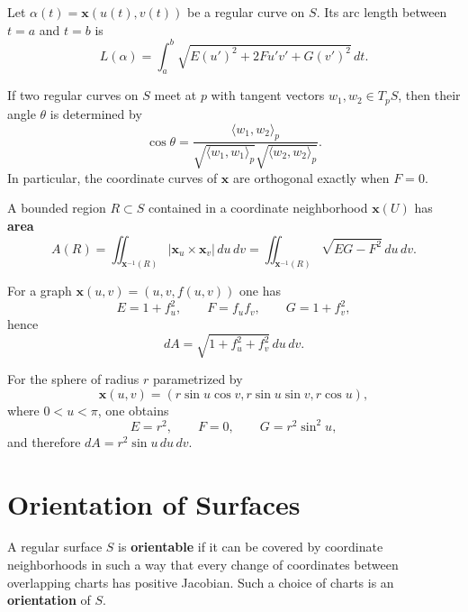 \documentclass[12pt, oneside]{book}
\begin{document}
\begin{proposition}
    Let $\alpha(t)=\mathbf{x}(u(t),v(t))$ be a regular curve on $S$.  Its
    arc length between $t=a$ and $t=b$ is
    \[
        L(\alpha)=\int_a^b
        \sqrt{
            E(u')^2+2Fu'v'+G(v')^2
        }\,dt.
    \]
\end{proposition}

\begin{proposition}
    If two regular curves on $S$ meet at $p$ with tangent vectors
    $w_1,w_2\in T_pS$, then their angle $\theta$ is determined by
    \[
        \cos \theta=
        \frac{\langle w_1,w_2\rangle_p}
        {\sqrt{\langle w_1,w_1\rangle_p}\sqrt{\langle w_2,w_2\rangle_p}}.
    \]
    In particular, the coordinate curves of $\mathbf{x}$ are orthogonal exactly
    when $F=0$.
\end{proposition}

\begin{definition}
    A bounded region $R\subset S$ contained in a coordinate neighborhood
    $\mathbf{x}(U)$ has \textbf{area}
    \[
        A(R)=\iint_{\mathbf{x}^{-1}(R)}
        |\mathbf{x}_u\times \mathbf{x}_v|\,du\,dv
        =
        \iint_{\mathbf{x}^{-1}(R)}\sqrt{EG-F^2}\,du\,dv.
    \]
\end{definition}

\begin{example}
    For a graph $\mathbf{x}(u,v)=(u,v,f(u,v))$ one has
    \[
        E=1+f_u^2,\qquad F=f_uf_v,\qquad G=1+f_v^2,
    \]
    hence
    \[
        dA=\sqrt{1+f_u^2+f_v^2}\,du\,dv.
    \]
\end{example}

\begin{example}
    For the sphere of radius $r$ parametrized by
    \[
        \mathbf{x}(u,v)=(r\sin u\cos v,r\sin u\sin v,r\cos u),
    \]
    where $0<u<\pi$, one obtains
    \[
        E=r^2,\qquad F=0,\qquad G=r^2\sin^2 u,
    \]
    and therefore $dA=r^2\sin u\,du\,dv$.
\end{example}

\section{Orientation of Surfaces}

\begin{definition}
    A regular surface $S$ is \textbf{orientable} if it can be covered by
    coordinate neighborhoods in such a way that every change of coordinates
    between overlapping charts has positive Jacobian.  Such a choice of charts
    is an \textbf{orientation} of $S$.
\end{definition}
\end{document}
